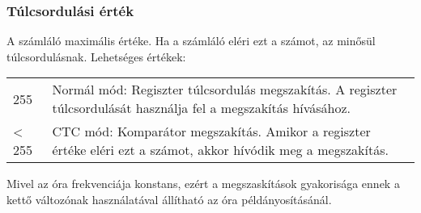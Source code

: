 \subsubsection*{Túlcsordulási érték} A számláló maximális értéke. Ha a számláló eléri ezt a számot, az minősül túlcsordulásnak.
Lehetséges értékek:
\captionsetup[table]{list=no}
\begin{table}[H]
\begin{tabularx}{\textwidth}{@{}lL@{}}
    255       & Normál mód: Regiszter túlcsordulás megszakítás. A regiszter túlcsordulását használja fel a megszakítás hívásához.     \\
    < 255     & CTC mód: Komparátor megszakítás. Amikor a regiszter értéke eléri ezt a számot, akkor hívódik meg a megszakítás.          \\
    \end{tabularx}
\end{table}
\captionsetup[table]{list=yes}
Mivel az óra frekvenciája konstans, ezért a megszaskítások gyakorisága ennek a kettő változónak használatával állítható az óra példányosításánál.